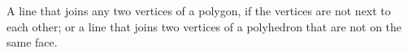 A line that joins any two vertices of a polygon, if the 
vertices are not next to each other; or a line that joins
two vertices of a polyhedron that are not on the same face.
